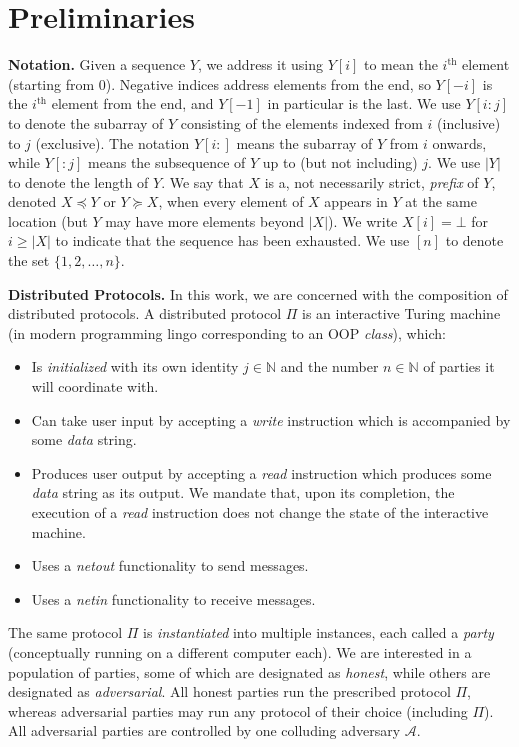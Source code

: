\section{Preliminaries}

\noindent
\textbf{Notation.}
Given a sequence $Y$, we address it using $Y[i]$ to mean the $i^\text{th}$ element (starting from $0$).
Negative indices address elements from the end, so $Y[-i]$ is the $i^\text{th}$ element from
the end, and $Y[-1]$ in particular is the last. We use $Y[i{:}j]$ to denote the subarray of $Y$
consisting of the elements indexed from $i$ (inclusive) to $j$ (exclusive). The notation $Y[i{:}]$ means the
subarray of $Y$ from $i$ onwards, while $Y[{:}j]$ means the subsequence of $Y$ up to (but not including) $j$.
We use $|Y|$ to denote the length of $Y$.
We say that $X$ is a, not necessarily strict,
\emph{prefix} of $Y$, denoted $X \preceq Y$
or $Y \succeq X$,
when every element of $X$ appears in $Y$ at the
same location (but $Y$ may have more elements beyond $|X|$).
We write $X[i] = \bot$ for $i \geq |X|$ to indicate that the sequence
has been exhausted.
We use $[n]$ to denote the set $\{1, 2, \ldots, n\}$.

\noindent
\textbf{Distributed Protocols.}
In this work, we are concerned with the composition of distributed
protocols. A distributed protocol $\Pi$ is an interactive Turing machine
(in modern programming lingo corresponding to an OOP \emph{class}),
which:

\begin{itemize}
  \item Is \emph{initialized} with its own identity $j \in \mathbb{N}$
        and the number $n \in \mathbb{N}$ of parties it will coordinate
        with.
  \item Can take user input by accepting a \emph{write} instruction which
        is accompanied by some \emph{data} string.
  \item Produces user output by accepting a \emph{read} instruction which
        produces some \emph{data} string as its output. We mandate that,
        upon its completion, the execution of a \emph{read} instruction
        does not change the state of the interactive machine.
  \item Uses a \emph{netout} functionality to send messages.
  \item Uses a \emph{netin} functionality to receive messages.
\end{itemize}

The same protocol $\Pi$ is \emph{instantiated} into multiple instances,
each called a \emph{party} (conceptually running on a different computer each).
We are interested in a population of parties, some of which are designated
as \emph{honest}, while others are designated as \emph{adversarial}.
All honest parties run the prescribed protocol $\Pi$, whereas adversarial
parties may run any protocol of their choice (including $\Pi$).
All adversarial parties are controlled by one colluding adversary $\mathcal{A}$.

